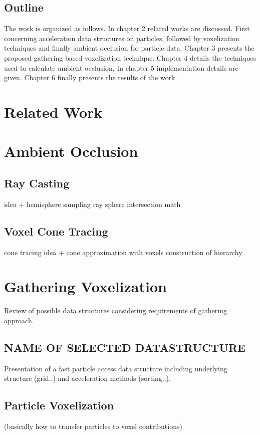 \documentclass[hyperref,german,diplominf]{cgvpub}
\begin{document}
\section{Outline}

The work is organized as follows. In chapter 2 related works are discussed. First concerning acceleration data structures on particles, followed by voxelization techniques and finally ambient occlusion for particle data.
Chapter 3 presents the proposed gathering based voxelization technique. 
Chapter 4 details the techniques used to calculate ambient occlusion. 
In chapter 5 implementation details are given.
Chapter 6 finally presents the results of the work.

\chapter{Related Work}

\chapter{Ambient Occlusion}

\section{Ray Casting}
idea + hemisphere sampling
ray sphere intersection math

\section{Voxel Cone Tracing}
cone tracing idea + cone approximation with voxels
construction of hierarchy

\chapter{Gathering Voxelization}
Review of possible data structures considering requirements of gathering approach.
\section{NAME OF SELECTED DATASTRUCTURE}
Presentation of a fast particle access data structure including underlying structure (grid..) and acceleration methods (sorting..).
\section{Particle Voxelization}
(basically how to transfer particles to voxel contributions)
\end{document}
